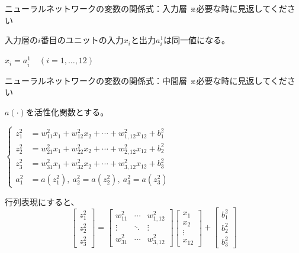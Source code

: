 \documentclass[dvipdfmx,aspectratio=169]{beamer}
\begin{document}
	\begin{frame}[allowframebreaks]{ニューラルネットワークの変数の関係式：入力層}
		※必要な時に見返してください\vspace{4em}
		
		入力層の$ i $番目のユニットの入力$ x_i $と出力$ a^1_i $は同一値になる。
		\begin{screen}
			$ x_i = a^1_i\quad (i=1, \dots, 12) $
		\end{screen}
	\end{frame}
	\begin{frame}[allowframebreaks]{ニューラルネットワークの変数の関係式：中間層}
		※必要な時に見返してください\vspace{1em}
		
		$ a(\cdot) $を活性化関数とする。
		\begin{screen}
			$ \left\{
			\begin{aligned}
				z^2_1 &= w^2_{11}x_1 + w^2_{12}x_2 + \cdots + w^2_{1,12}x_{12} + b^2_1\\
				z^2_2 &= w^2_{21}x_1 + w^2_{22}x_2 + \cdots + w^2_{2,12}x_{12} + b^2_2\\
				z^2_3 &= w^2_{31}x_1 + w^2_{32}x_2 + \cdots + w^2_{3,12}x_{12} + b^2_3\\
				a^2_1 &= a(z^2_1),\ a^2_2 = a(z^2_2),\ a^2_3 = a(z^2_3)
			\end{aligned}
			\right. $
		\end{screen}
		行列表現にすると、
		\begin{equation*}
			\begin{bmatrix}
			z^2_1\\ z^2_2\\ z^2_3
			\end{bmatrix} = \begin{bmatrix}
				w^2_{11} 	& \cdots & w^2_{1,12}\\
				\vdots 		& \ddots & \vdots\\
				w^2_{31}	& \cdots & w^2_{3,12}
			\end{bmatrix} \begin{bmatrix}
				x_1\\ x_2\\ \vdots\\ x_{12}
			\end{bmatrix} + \begin{bmatrix}
				b^2_1\\ b^2_2\\ b^2_3
			\end{bmatrix}
		\end{equation*}

\end{frame}
\end{document}
